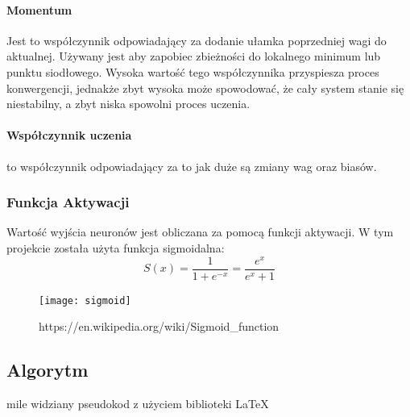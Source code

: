 \documentclass[12pt,a4paper]{article}
\begin{document}
\paragraph*{Momentum} Jest to współczynnik odpowiadający za dodanie ułamka poprzedniej wagi do aktualnej. Używany jest aby zapobiec zbieżności do lokalnego minimum lub punktu siodłowego. Wysoka wartość tego współczynnika przyspiesza proces konwergencji, jednakże zbyt wysoka może spowodować, że cały system stanie się niestabilny, a zbyt niska spowolni proces uczenia.
\paragraph*{Współczynnik uczenia} to współczynnik odpowiadający za to jak duże są zmiany wag oraz biasów.
\subsubsection*{Funkcja Aktywacji}
Wartość wyjścia neuronów jest obliczana za pomocą funkcji aktywacji. W tym projekcie została użyta funkcja sigmoidalna:
$$ S(x) = \frac{1}{1+e^{-x}} = \frac{e^x}{e^x+1} $$
\begin{figure}[h]
\centering
\texttt{[image: sigmoid]}
\caption{https://en.wikipedia.org/wiki/Sigmoid\_function}
\end{figure}
	\subsection*{Algorytm}
	mile widziany pseudokod z użyciem biblioteki \LaTeX
\end{document}

